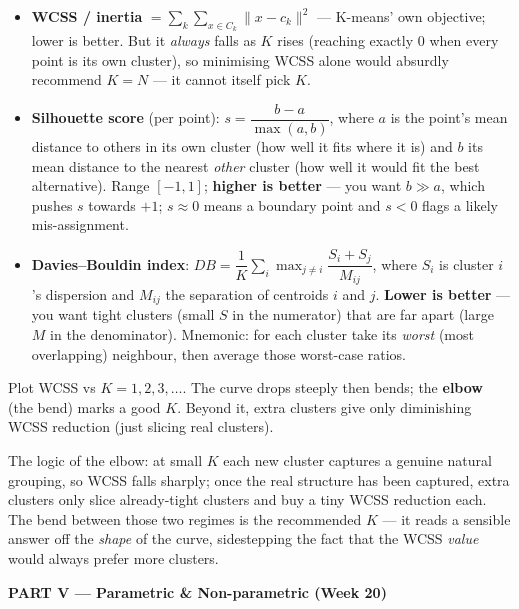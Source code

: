 \documentclass[11pt, a4paper]{article}
\newcommand{\kw}[1]{\textbf{#1}}
\begin{document}
\begin{itemize}
  \item \kw{WCSS / inertia} $=\sum_k\sum_{x\in C_k}\|x-c_k\|^2$ — K-means' own objective; lower is
  better. But it \emph{always} falls as $K$ rises (reaching exactly $0$ when every point is its own
  cluster), so minimising WCSS alone would absurdly recommend $K=N$ — it cannot itself pick $K$.
  \item \kw{Silhouette score} (per point): $s=\dfrac{b-a}{\max(a,b)}$, where $a$ is the point's mean
  distance to others in its own cluster (how well it fits where it is) and $b$ its mean distance to
  the nearest \emph{other} cluster (how well it would fit the best alternative). Range $[-1,1]$;
  \kw{higher is better} — you want $b\gg a$, which pushes $s$ towards $+1$; $s\approx0$ means a
  boundary point and $s<0$ flags a likely mis-assignment.
  \item \kw{Davies–Bouldin index}: $DB=\dfrac{1}{K}\sum_i\max_{j\ne i}\dfrac{S_i+S_j}{M_{ij}}$,
  where $S_i$ is cluster $i$'s dispersion and $M_{ij}$ the separation of centroids $i$ and $j$.
  \kw{Lower is better} — you want tight clusters (small $S$ in the numerator) that are far apart
  (large $M$ in the denominator). Mnemonic: for each cluster take its \emph{worst} (most
  overlapping) neighbour, then average those worst-case ratios.
\end{itemize}

\begin{defbox}
Plot WCSS vs $K=1,2,3,\dots$. The curve drops steeply then bends; the \kw{elbow} (the bend) marks a
good $K$. Beyond it, extra clusters give only diminishing WCSS reduction (just slicing real clusters).
\end{defbox}

The logic of the elbow: at small $K$ each new cluster captures a genuine natural grouping, so WCSS
falls sharply; once the real structure has been captured, extra clusters only slice already-tight
clusters and buy a tiny WCSS reduction each. The bend between those two regimes is the recommended
$K$ — it reads a sensible answer off the \emph{shape} of the curve, sidestepping the fact that the
WCSS \emph{value} would always prefer more clusters.

\begin{center}\large\bfseries\color{defBd} PART V — Parametric \& Non-parametric (Week 20)\end{center}

\end{document}
